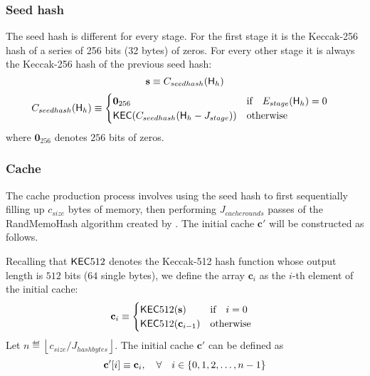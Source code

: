 \subsubsection{Seed hash}
The seed hash is different for every stage. For the first stage it is the Keccak-256 hash of a series of 256 bits (32 bytes) of zeros. For every other stage it is always the Keccak-256 hash of the previous seed hash:
\begin{equation}
 \mathbf{s} \equiv C_{seedhash}(\textsf{H}_{h})
\end{equation}
\begin{equation}
 C_{seedhash}(\textsf{H}_{h}) \equiv \begin{cases}
\mathbf{0}_{256} & \text{if} \quad E_{stage}(\textsf{H}_{h}) = 0 \quad  \\
\mathsf{KEC}(C_{seedhash}(\textsf{H}_{h} - J_{stage})) & \text{otherwise}
\end{cases}
\end{equation}
where $\mathbf{0}_{256}$ denotes $256$ bits of zeros.

\subsubsection{Cache}
The cache production process involves using the seed hash to first sequentially filling up $c_{size}$ bytes of memory, then performing $J_{cacherounds}$ passes of the RandMemoHash algorithm created by \cite{lerner2014randmemohash}. The initial cache $\mathbf{c'}$ will be constructed as follows.

Recalling that $\mathsf{KEC}512$ denotes the Keccak-512 hash function whose output length is $512$ bits ($64$ single bytes), 
we define the array $\mathbf{c}_{i}$ as the $i$-th element of the initial cache:
\begin{equation}
	\mathbf{c}_{i} \equiv 
	\begin{cases}
		\mathsf{KEC}512(\mathbf{s}) & \text{if} \quad i = 0 \quad  \\
		\mathsf{KEC}512(\mathbf{c}_{i-1}) & \text{otherwise}
	\end{cases}
\end{equation}
Let $n \eqdef \left\lfloor c_{size}/J_{hashbytes}\right\rfloor$.
The initial cache $\mathbf{c'}$ can be defined as
\begin{equation}
 \mathbf{c'}[i] \equiv \mathbf{c}_{i}, \quad \forall \quad i \in{\left \{{0,1,2,\dots, n-1} \right \}}
\end{equation}


